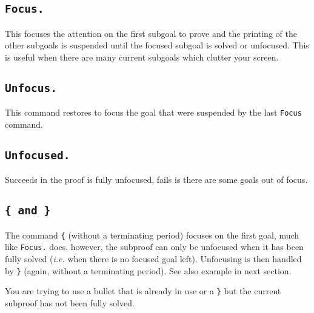 \begin{ErrMsgs}
\item {}
\end{ErrMsgs}

\subsection[\tt Focus.]{\tt Focus.}
This focuses the attention on the first subgoal to prove and the printing
of the other subgoals is suspended until the focused subgoal is
solved or unfocused. This is useful when there are many current
subgoals which clutter your screen.


\subsection[\tt Unfocus.]{\tt Unfocus.}
This command restores to focus the goal that were suspended by the
last {\tt Focus} command.

\subsection[\tt Unfocused.]{\tt Unfocused.}
Succeeds in the proof is fully unfocused, fails is there are some
goals out of focus.

\subsection[\tt \{ \textrm{and} \}]{\tt \{ \textrm{and} \}\comindex{\{}\comindex{\}}}
The command {\tt \{} (without a terminating period) focuses on the
first goal, much like {\tt Focus.} does, however, the subproof can
only be unfocused when it has been fully solved (\emph{i.e.} when
there is no focused goal left). Unfocusing is then handled by {\tt \}}
(again, without a terminating period). See also example in next section.

\begin{ErrMsgs}
\item {}
  You are trying to use a bullet that is already in use or a {\tt \}} but the current
  subproof has not been fully solved.
\end{ErrMsgs}

